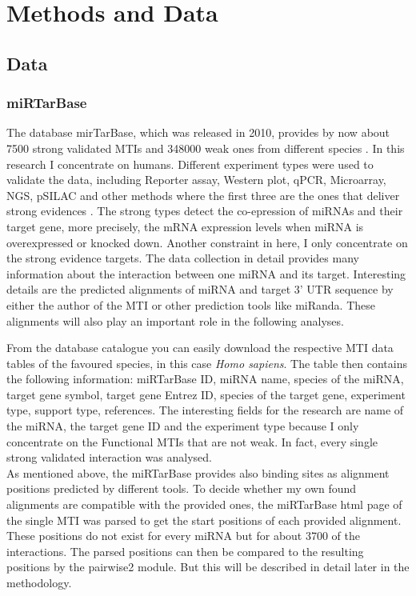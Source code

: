 \documentclass[12pt]{article}
\begin{document}
\vspace{2cm}


\section{Methods and Data}

 
\subsection{Data} 
\subsubsection{miRTarBase}
The database mirTarBase, which was released in 2010, provides by now about 7500 strong validated MTIs and 348000 weak ones from different species \cite{Chou}. In this research I concentrate on humans. Different experiment types were used to validate the data, including Reporter assay, Western plot, qPCR, Microarray, NGS, pSILAC and other methods where the first three are the ones that deliver strong evidences \cite{Hsu}. The strong types detect the co-epression of miRNAs and their target gene, more precisely, the mRNA expression levels when miRNA is overexpressed or knocked down. Another constraint in here, I only concentrate on the strong evidence targets. The data collection in detail provides many information about the interaction between one miRNA and its target. Interesting details are the predicted alignments of miRNA and target 3' UTR sequence by either the author of the MTI or other prediction tools like miRanda. These alignments will also play an important role in the following analyses. 

From the database catalogue you can easily download the respective MTI data tables of the favoured species, in this case \textit{Homo sapiens}. The table then contains the following information: miRTarBase ID, miRNA name, species of the miRNA, target gene symbol, target gene Entrez ID, species of the target gene, experiment type, support type, references. The interesting fields for the research are name of the miRNA, the target gene ID and the experiment type because I only concentrate on the Functional MTIs that are not weak. In fact, every single strong validated interaction was analysed.\\

As mentioned above, the miRTarBase provides also binding sites as alignment positions predicted by different tools. To decide whether my own found alignments are compatible with the provided ones, the miRTarBase html page of the single MTI was parsed to get the start positions of each provided alignment. These positions do not exist for every miRNA but for about 3700 of the interactions. The parsed positions can then be compared to the resulting positions by the pairwise2 module. But this will be described in detail later in the methodology. 
\end{document}
